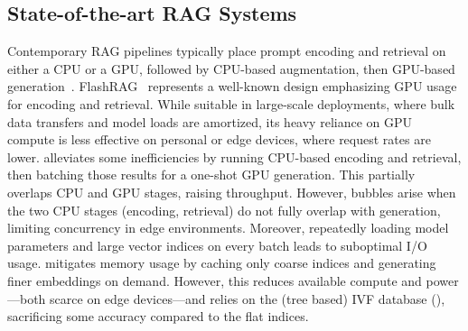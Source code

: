 

\subsection{State-of-the-art RAG Systems}
\label{sec:rag-sota}
Contemporary RAG pipelines typically place prompt encoding and retrieval on either a CPU or a GPU, followed by CPU-based augmentation, then GPU-based generation~\cite{jin2024flashrag, jiang2024piperag, EdgeRAG}. 
FlashRAG~\cite{jin2024flashrag} represents a well-known design emphasizing GPU usage for encoding and retrieval. While suitable in large-scale deployments, where bulk data transfers and model loads are amortized, its heavy reliance on GPU compute is less effective on personal or edge devices, where request rates are lower. 
\pipeRAG{} alleviates some inefficiencies by running CPU-based encoding and retrieval, then batching those results for a one-shot GPU generation. This partially overlaps CPU and GPU stages, raising throughput. However, bubbles arise when the two CPU stages (encoding, retrieval) do not fully overlap with generation, limiting concurrency in edge environments. Moreover, repeatedly loading model parameters and large vector indices on every batch leads to suboptimal I/O usage. 
\edgeRAG{} mitigates memory usage by caching only coarse indices and generating finer embeddings on demand. However, this reduces available compute and power—both scarce on edge devices—and relies on the (tree based) IVF database (), sacrificing some accuracy compared to the flat indices.

